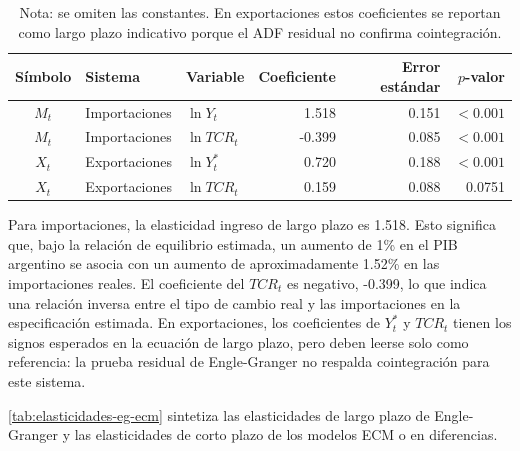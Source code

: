 \documentclass[11pt,a4paper]{article}
\begin{document}
	\begin{table}[H]
		\centering
		\caption{Coeficientes de largo plazo Engle-Granger.}
		\label{tab:coeficientes-largo-plazo-eg}
		\small
		\begin{tabular}{cllrrr}
			\toprule
			Símbolo & Sistema & Variable & Coeficiente & Error estándar & \(p\)-valor \\
			\midrule
			\(M_t\) & Importaciones & \(\ln Y_t\) & 1.518 & 0.151 & \(<0.001\) \\
			\(M_t\) & Importaciones & \(\ln TCR_t\) & -0.399 & 0.085 & \(<0.001\) \\
			\(X_t\) & Exportaciones & \(\ln Y_t^*\) & 0.720 & 0.188 & \(<0.001\) \\
			\(X_t\) & Exportaciones & \(\ln TCR_t\) & 0.159 & 0.088 & 0.0751 \\
			\bottomrule
		\end{tabular}
		\caption*{\footnotesize Nota: se omiten las constantes. En exportaciones estos
			coeficientes se reportan como largo plazo indicativo porque el ADF residual no
			confirma cointegración.}
	\end{table}
	
	Para importaciones, la elasticidad ingreso de largo plazo es 1.518. Esto
	significa que, bajo la relación de equilibrio estimada, un aumento de 1\% en el
	PIB argentino se asocia con un aumento de aproximadamente 1.52\% en las
	importaciones reales. El coeficiente del \(TCR_t\) es negativo, -0.399, lo que
	indica una relación inversa entre el tipo de cambio real y las importaciones en
	la especificación estimada. En exportaciones, los coeficientes de \(Y_t^*\) y
	\(TCR_t\) tienen los signos esperados en la ecuación de largo plazo, pero deben
	leerse solo como referencia: la prueba residual de Engle-Granger no respalda
	cointegración para este sistema.
	
	\autoref{tab:elasticidades-eg-ecm} sintetiza las elasticidades de largo plazo
	de Engle-Granger y las elasticidades de corto plazo de los modelos ECM o en
	diferencias.
	
\end{document}
